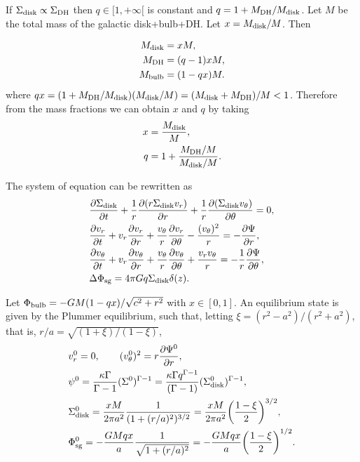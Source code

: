 \documentclass[11pt]{article}
\newcommand{\vr}{v_{r}}
\newcommand{\vt}{v_{\theta}}
\newcommand{\Sigmad}{\Sigma_{\rm{disk}}}
\newcommand{\Phib}{\Phi_{\rm{bulb}}}
\newcommand{\Phisg}{\Phi_{\rm{sg}}}
\newcommand{\Mb}{M_{\rm{bulb}}}
\newcommand{\Md}{M_{\rm{disk}}}
\newcommand{\Mdh}{M_{\rm{DH}}}
\begin{document}
If $\Sigma_{\rm{disk}}\propto\Sigma_{\rm{DH}}$ then $q\in [1,+\infty[$ is constant and $q=1+\Mdh/\Md$. Let  $M$ be the total mass of the galactic disk+bulb+DH. Let $x=\Md/M$.  Then

\begin{align*}
\Md &= x M,\\
\Mdh &= (q-1) x M,\\
\Mb &= (1 - qx)M  .
\end{align*}
where $qx=(1+\Mdh/\Md)(\Md/M)=(\Md+\Mdh)/M < 1$. Therefore from the mass fractions we can obtain $x$ and $q$ by taking
\begin{align*}
x&=  \frac{\Md }{M},\\
q &= 1+\frac{\Mdh/M}{\Md/M}  .
\end{align*}

The system of equation can be rewritten as 
\begin{align}
&\frac{\partial \Sigmad}{\partial t} + \frac{1}{r} \frac{\partial(r\Sigmad \vr)}{\partial r} + \frac{1}{r} \frac{\partial(\Sigmad \vt)}{\partial \theta} = 0 ,\\
&\frac{\partial \vr}{\partial t} + \vr \frac{\partial \vr}{\partial r} + \frac{\vt}{r} \frac{\partial \vr}{\partial \theta} - \frac{(\vt)^2}{r} = -\frac{\partial \Psi}{\partial r} ,\\
&\frac{\partial \vt}{\partial t} + \vr \frac{\partial \vt}{\partial r} + \frac{\vt}{r} \frac{\partial \vt}{\partial \theta} + \frac{\vr\vt}{r} = -\frac{1}{r}\frac{\partial \Psi}{\partial \theta} ,\\
& \Delta \Phisg = 4\pi G q\Sigmad \delta (z).
\end{align}

 Let $\Phib = - G M (1-q x)/\sqrt{c^2+r^2}$ with $x\in [0,1]$. An equilibrium state is given by the Plummer equilibrium, such that,  letting $\xi = (r^2-a^2)/(r^2+a^2) $, that is, $r/a=\sqrt{(1+\xi)/(1-\xi)}$,
\begin{align*}
&\vr^0 = 0,\quad \quad (\vt^0)^2 = r \frac{\partial \Psi^0}{\partial r}, \\
& \psi^0 = \frac{\kappa \Gamma}{\Gamma-1} (\Sigma^0)^{\Gamma-1} = \frac{\kappa \Gamma q^{\Gamma-1}}{(\Gamma-1)} (\Sigmad^0)^{\Gamma-1},\\
& \Sigmad^0 = \frac{xM}{2\pi a^2} \frac{1}{(1+(r/a)^2)^{3/2}} =\frac{xM}{2\pi a^2}   \bigg(\frac{1-\xi}{2}\bigg)^{3/2},\\
& \Phisg^0 = -\frac{G Mqx}{a } \frac{1}{\sqrt{1+(r/a)^2}} = -\frac{G M qx}{a } \bigg(\frac{1-\xi}{2}\bigg)^{1/2} .
\end{align*}
\end{document}
